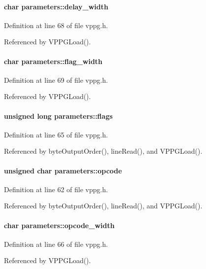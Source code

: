 \paragraph[{delay\_\-width}]{\setlength{\rightskip}{0pt plus 5cm}char {\bf parameters::delay\_\-width}}\hfill\label{structparameters_a3c19394f209d2e08bd691c8ba313da4d}


Definition at line 68 of file vppg.h.

Referenced by VPPGLoad().
\paragraph[{flag\_\-width}]{\setlength{\rightskip}{0pt plus 5cm}char {\bf parameters::flag\_\-width}}\hfill\label{structparameters_ad44038e71483c701e15fb9716e0da874}


Definition at line 69 of file vppg.h.

Referenced by VPPGLoad().
\paragraph[{flags}]{\setlength{\rightskip}{0pt plus 5cm}unsigned long {\bf parameters::flags}}\hfill\label{structparameters_a329806d1dd29c752ab308dfa56a68722}


Definition at line 65 of file vppg.h.

Referenced by byteOutputOrder(), lineRead(), and VPPGLoad().
\paragraph[{opcode}]{\setlength{\rightskip}{0pt plus 5cm}unsigned char {\bf parameters::opcode}}\hfill\label{structparameters_a39e8d2d62ecfe916f6b99f1ccd643e69}


Definition at line 62 of file vppg.h.

Referenced by byteOutputOrder(), lineRead(), and VPPGLoad().
\paragraph[{opcode\_\-width}]{\setlength{\rightskip}{0pt plus 5cm}char {\bf parameters::opcode\_\-width}}\hfill\label{structparameters_a279e7c7df6967e0022570855934d1f8b}


Definition at line 66 of file vppg.h.

Referenced by VPPGLoad().